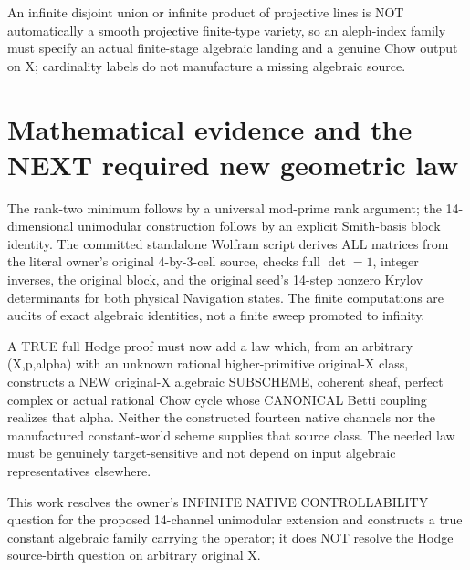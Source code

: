 \documentclass[11pt]{article}
\begin{document}
An infinite disjoint union or infinite
product of projective lines is NOT
automatically a smooth projective
finite-type variety, so an aleph-index
family must specify an actual
finite-stage algebraic landing
and a genuine Chow output on X;
cardinality labels do not manufacture
a missing algebraic source.

\section{Mathematical evidence and the NEXT required new geometric law}
The rank-two minimum follows by a
universal mod-prime rank argument;
the 14-dimensional unimodular
construction follows by an explicit
Smith-basis block identity.
The committed standalone Wolfram
script derives ALL matrices from the
literal owner's original 4-by-3-cell
source, checks full \(\det=1\),
integer inverses, the original block,
and the original seed's 14-step
nonzero Krylov determinants for
both physical Navigation states.
The finite computations are audits
of exact algebraic identities, not
a finite sweep promoted to infinity.

A TRUE full Hodge proof must now add
a law which, from an arbitrary
(X,p,alpha) with an unknown rational
higher-primitive original-X class,
constructs a NEW original-X
algebraic SUBSCHEME, coherent sheaf,
perfect complex or actual rational
Chow cycle whose CANONICAL Betti
coupling realizes that alpha.
Neither the constructed fourteen
native channels nor the manufactured
constant-world scheme supplies
that source class. The needed law
must be genuinely target-sensitive
and not depend on input algebraic
representatives elsewhere.

This work resolves the owner's
INFINITE NATIVE CONTROLLABILITY question
for the proposed 14-channel
unimodular extension and constructs
a true constant algebraic family
carrying the operator; it does NOT
resolve the Hodge source-birth
question on arbitrary original X.
\end{document}
